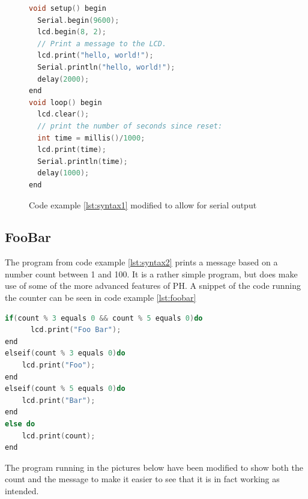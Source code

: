 \begin{figure}[h!]
\begin{lstlisting}[caption=Hello World with serial output, language={C++},label=lst:serial]
void setup() begin
  Serial.begin(9600);
  lcd.begin(8, 2);
  // Print a message to the LCD.
  lcd.print("hello, world!");
  Serial.println("hello, world!");
  delay(2000);
end
void loop() begin
  lcd.clear();
  // print the number of seconds since reset:
  int time = millis()/1000; 
  lcd.print(time);
  Serial.println(time);
  delay(1000);
end
\end{lstlisting}
\caption{Code example \ref{lst:syntax1} modified to allow for serial output}
\end{figure}

\subsection*{FooBar}
The program from code example \ref{lst:syntax2} prints a message based on a number count between 1 and 100. It is a rather simple program, but does make use of some of the more advanced features of PH. A snippet of the code running the counter can be seen in code example \ref{lst:foobar}
\begin{lstlisting}[caption=Hello World with serial output,firstnumber=26, language={C++},label=lst:foobar]
if(count % 3 equals 0 && count % 5 equals 0)do
      lcd.print("Foo Bar"); 
end
elseif(count % 3 equals 0)do
    lcd.print("Foo");
end
elseif(count % 5 equals 0)do
    lcd.print("Bar");
end
else do
    lcd.print(count);
end
\end{lstlisting}

The program running in the pictures below have been modified to show both the count and the message to make it easier to see that it is in fact working as intended.

